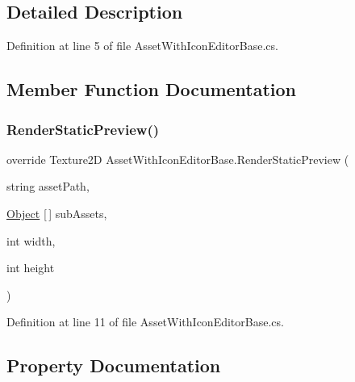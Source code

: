 \subsection{Detailed Description}


Definition at line 5 of file Asset\+With\+Icon\+Editor\+Base.\+cs.



\subsection{Member Function Documentation}
\mbox{\label{class_asset_with_icon_editor_base_a1a667f6122e158a4f8f6a46c72ad7b76}} 
\subsubsection{\texorpdfstring{Render\+Static\+Preview()}{RenderStaticPreview()}}
{\footnotesize\ttfamily override Texture2D Asset\+With\+Icon\+Editor\+Base.\+Render\+Static\+Preview (\begin{DoxyParamCaption}\item[{string}]{asset\+Path,  }\item[{\mbox{\hyperlink{_quads_8cs_aef19bab18b9814edeef255c43e4f6bbc}{Object}} \mbox{[}$\,$\mbox{]}}]{sub\+Assets,  }\item[{int}]{width,  }\item[{int}]{height }\end{DoxyParamCaption})}



Definition at line 11 of file Asset\+With\+Icon\+Editor\+Base.\+cs.



\subsection{Property Documentation}
\mbox{\label{class_asset_with_icon_editor_base_ad639c9f4a71d958dc3b9cd510391a2e2}} 
